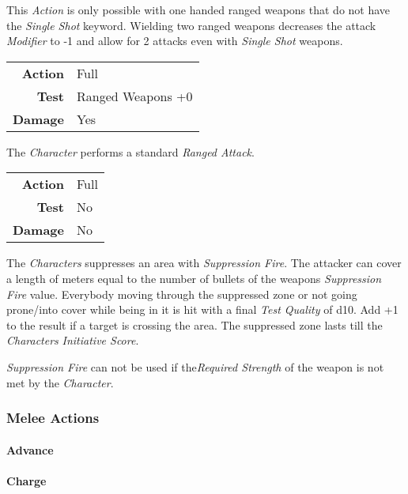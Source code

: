 This \emph{Action} is only possible with one handed ranged weapons that do
not have the \emph{Single Shot} keyword. Wielding two ranged weapons decreases
the attack \emph{Modifier} to -1 and allow for 2 attacks even with
\emph{Single Shot} weapons.

\begin{tabular}{rl}
    \textbf{Action} & Full              \\
    \textbf{Test}   & Ranged Weapons +0 \\
    \textbf{Damage} & Yes               \\
\end{tabular}

\hfill

The \emph{Character} performs a standard \emph{Ranged Attack}.


\begin{tabular}{rl}
    \textbf{Action} & Full \\
    \textbf{Test}   & No   \\
    \textbf{Damage} & No   \\
\end{tabular}

The \emph{Characters} suppresses an area with \emph{Suppression Fire}.
The attacker can cover a length of meters equal to the number of bullets of the
weapons \emph{Suppression Fire} value. Everybody moving through the suppressed
zone or not going prone/into cover while being in it is hit with a final
\emph{Test Quality} of d10. Add +1 to the result if a target is crossing the
area. The suppressed zone lasts till the \emph{Characters} \emph{Initiative Score}.

\emph{Suppression Fire} can not be used if the\emph{Required Strength} of the
weapon is not met by the \emph{Character}.

\subsubsection{Melee Actions}

\paragraph{Advance}

\paragraph{Charge}

